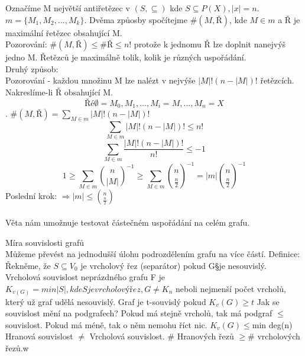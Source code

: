\documentclass{article}
\begin{document}
Označíme M největší antiřetězec v $(S, \subseteq)$ kde $S \subseteq P(X), |x| = n$.
$m = \{M_{1},M_{2},...,M_{k}\}$. Dvěma způosby spočítejme $\#(M,Ř)$, kde $M \in m$ a $Ř$ je maximální
řetězec obsahující M.\\
Pozorování: $\#(M,Ř) \leq \#Ř \leq n!$ protože k jednomu Ř lze doplnit nanejvýš jedno M. Řetězců je maximálně tolik,
kolik je různých uspořádání. \\
Druhý způsob: \\
Pozorování - každou množinu M lze nalézt v nejvýše $|M|!(n-|M|)!$ řetězcích. Nakreslíme-li Ř obsahující M.\\
$$Ř é \emptyset = M_{0},M_{1},...,M_{i}=M,...,M_{n}=X$$. $\#(M,Ř) = \sum_{M \in m} |M|!(n-|M|)!$\\
$$\sum_{M \in m} |M|!(n-|M|)! \leq n!$$
$$\sum_{M \in m} \frac{|M|!(n-|M|)!}{n!} \leq -1$$
$$1 \geq \sum_{M \in m} \binom{n}{|M|}^{-1} \geq \sum_{M \in m} \binom{n}{\frac{n}{2}}^{-1} = |m| \binom{n}{\frac{n}{2}}^{-1}$$
Poslední krok: $ \Rightarrow  |m| \leq \binom{n}{\frac{n}{2}}$\\\\
Věta nám umožnuje testovat částečném uspořádání na celém grafu.

Míra souvislosti grafů\\
Můžeme převést na jednodušší úlohu podrozdělením grafu na více částí.
Definice: Řekněme, že $S \subseteq V_{0}$ je vrcholový řez (separátor) pokud G\S je nesouvislý.
Vrcholová souvislost neprázdného grafu F je $K_{v(G)} = min|S|, kde S je vrcholový řez, G\neq K_{n}$ neboli nejmenší počet vrcholů, který už graf udělá nesouvislý.
Graf je t-souvislý pokud $K_{v}(G)\geq t$
Jak se souvislost mění na podgrafech?
Pokud má stejně vrcholů, tak má podgraf $\leq$ souvislost.
Pokud má méně, tak o něm nemohu říct nic.
$K_{v}(G) \leq $min deg(n) 
Hranová souvislost $\neq$ Vrcholová souvislost.
$\#$ Hranových řezů $\geq \#$ vrcholových řezů.w
\end{document}
